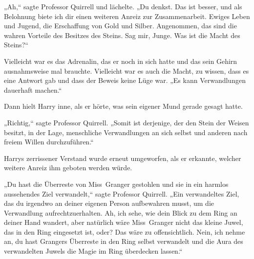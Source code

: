 „Ah,“ sagte Professor Quirrell und lächelte. „Du denkst. Das ist besser, und als Belohnung biete ich dir einen weiteren Anreiz zur Zusammenarbeit. Ewiges Leben und Jugend, die Erschaffung von Gold und Silber. Angenommen, das sind die wahren Vorteile des Besitzes des Steins. Sag mir, Junge. Was ist die Macht des Steins?“

Vielleicht war es das Adrenalin, das er noch in sich hatte und das sein Gehirn ausnahmsweise mal brauchte. Vielleicht war es auch die Macht, zu wissen, dass es eine Antwort gab und dass der Beweis keine Lüge war.
„Es kann Verwandlungen dauerhaft machen.“

Dann hielt Harry inne, als er hörte, was sein eigener Mund gerade gesagt hatte.

„Richtig,“ sagte Professor Quirrell. „Somit ist derjenige, der den Stein der Weisen besitzt, in der Lage, menschliche Verwandlungen an sich selbst und anderen nach freiem Willen durchzuführen.“

Harrys zerrissener Verstand wurde erneut umgeworfen, als er erkannte, welcher weitere Anreiz ihm geboten werden würde.

„Du hast die Überreste von Miss~Granger gestohlen und sie in ein harmlos aussehendes Ziel verwandelt,“ sagte Professor Quirrell.
„Ein verwandeltes Ziel, das du irgendwo an deiner eigenen Person aufbewahren musst, um die Verwandlung aufrechtzuerhalten. Ah, ich sehe, wie dein Blick zu dem Ring an deiner Hand wandert, aber natürlich wäre Miss~Granger nicht das kleine Juwel, das in den Ring eingesetzt ist, oder? Das wäre zu offensichtlich. Nein, ich nehme an, du hast Grangers Überreste in den Ring selbst verwandelt und die Aura des verwandelten Juwels die Magie im Ring überdecken lassen.“

